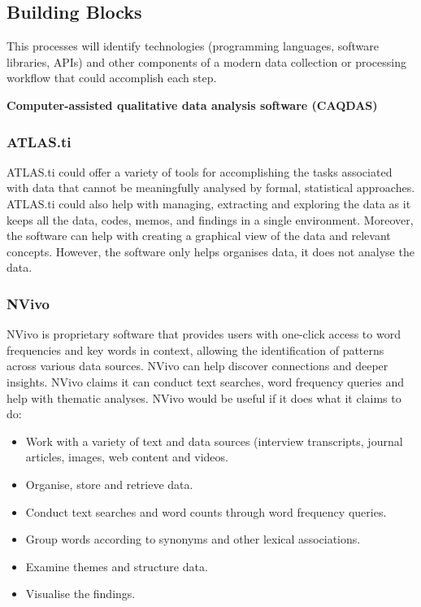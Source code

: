 \documentclass{article}
\begin{document}
\subsection{Building Blocks}
This processes will identify technologies (programming languages, software libraries, APIs) and other components of a modern data collection or processing workflow that could accomplish each step.

\setlength{\parindent}{0em}
\setlength{\parskip}{1em}
\begin{center}
\textbf{Computer-assisted qualitative data analysis software (CAQDAS)}
\end{center}

\subsubsection{ATLAS.ti}
ATLAS.ti could offer a variety of tools for accomplishing the tasks associated with data that cannot be meaningfully analysed by formal, statistical approaches. ATLAS.ti could also help with managing, extracting and exploring the data as it keeps all the data, codes, memos, and findings in a single environment. Moreover, the software can help with creating a graphical view of the data and relevant concepts. However, the software only helps organises data, it does not analyse the data. 

\subsubsection{NVivo}
NVivo is proprietary software that provides users with one-click access to word frequencies and key words in context, allowing the identification of patterns across various data sources. NVivo can help discover connections and deeper insights. NVivo claims it can conduct text searches, word frequency queries and help with thematic analyses. NVivo would be useful if it does what it claims to do:
\begin{itemize}
    \item Work with a variety of text and data sources (interview transcripts, journal articles, images, web content and videos.
    \item Organise, store and retrieve data.
    \item Conduct text searches and word counts through word frequency queries. 
    \item Group words according to synonyms and other lexical associations.
    \item Examine themes and structure data.
    \item Visualise the findings.
\end{itemize}
\end{document}
